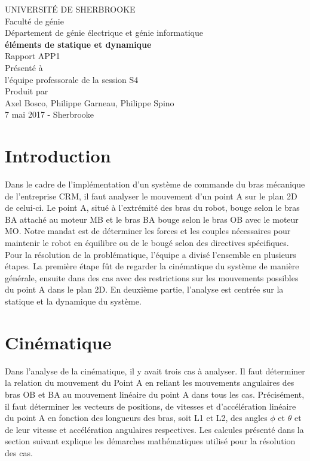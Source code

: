 \documentclass{article}
\begin{document}
\begin{titlepage}   
	\large{
		\begin{center}
			UNIVERSITÉ DE SHERBROOKE\\Faculté de génie\\
			Département de génie électrique et génie informatique\\
			\vspace{3cm}
			{\LARGE\textbf{éléments de statique et dynamique}}\\
			\vspace{2cm}
			\LARGE{Rapport APP1}\\
			\vspace{2cm}
			Présenté à\\l'équipe professorale de la session S4\\
			\vspace{2cm}
			Produit par\\Axel Bosco, Philippe Garneau, Philippe Spino\\
			\vspace{1cm}
			\vfill{7 mai 2017 - Sherbrooke}
		\end{center}
	}
\end{titlepage}
\newpage
\tableofcontents

\newpage
\section{Introduction}
Dans le cadre de l’implémentation d’un système de commande du bras mécanique de l’entreprise CRM, il faut analyser le mouvement d’un point A sur le plan 2D de celui-ci. Le point A, situé à l’extrémité des bras du robot, bouge selon le bras BA attaché au moteur MB et le bras BA bouge selon le bras OB avec le moteur MO. Notre mandat est de déterminer les forces et les couples nécessaires pour maintenir le robot en équilibre ou de le bougé selon des directives spécifiques. Pour la résolution de la problématique, l’équipe a divisé l’ensemble en plusieurs étapes. La première étape fût de regarder la cinématique du système de manière générale, ensuite dans des cas avec des restrictions sur les mouvements possibles du point A dans le plan 2D. En deuxième partie, l’analyse est centrée sur la statique et la dynamique du système.

\section{Cinématique}
Dans l'analyse de la cinématique, il y avait trois cas à analyser. Il faut déterminer la relation du mouvement du Point A en reliant les mouvements angulaires des bras OB et BA au mouvement linéaire du point A dans tous les cas. Précisément, il faut déterminer les vecteurs de positions, de vitesses et d’accélération linéaire du point A en fonction des longueurs des bras, soit L1 et L2, des angles $\phi$ et $\theta$ et de leur vitesse et accélération angulaires respectives.
Les calcules présenté dans la section suivant explique les démarches mathématiques utilisé pour la résolution des cas.
\end{document}
